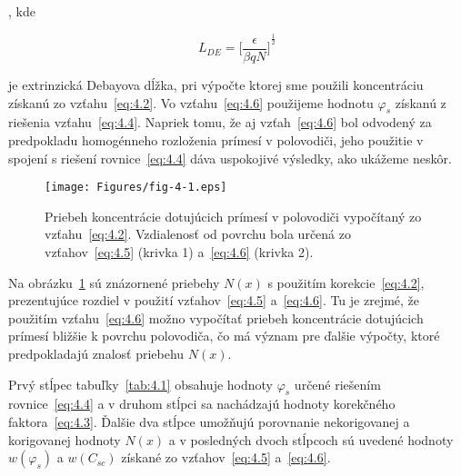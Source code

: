 , kde 

\begin{equation}\label{eq:4.7}
  L_{DE} = {\Big[\frac{\epsilon}{\beta qN}\Big]}^{\frac{1}{2}}
\end{equation}

je extrinzická Debayova dĺžka, pri výpočte ktorej sme použili
koncentráciu získanú zo vzťahu~\ref{eq:4.2}.  Vo vzťahu~\ref{eq:4.6}
použijeme hodnotu $\varphi_{s}$ získanú z riešenia
vzťahu~\ref{eq:4.4}.  Napriek tomu, že aj vzťah~\ref{eq:4.6} bol
odvodený za predpokladu homogénneho rozloženia prímesí v polovodiči,
jeho použitie v spojení s riešení rovnice~\ref{eq:4.4} dáva uspokojivé
výsledky, ako ukážeme neskôr.

\begin{figure}[h!]\centering
  \begin{minipage}[c]{\myfiguresize}
    \begin{center}
      \texttt{[image: Figures/fig-4-1.eps]}%
      \caption[Priebeh koncentrácie dotujúcich prímesí v polovodiči
        vypočítaný zo vzťahu~\ref{eq:4.2}]{Priebeh koncentrácie
        dotujúcich prímesí v polovodiči vypočítaný zo
        vzťahu~\ref{eq:4.2}. Vzdialenosť od povrchu bola určená zo
        vzťahov~\ref{eq:4.5} (krivka 1) a~\ref{eq:4.6} (krivka
        2).}\label{fig:4.1}
    \end{center}
  \end{minipage}
\end{figure}

Na obrázku~\ref{fig:4.1} sú znázornené priebehy $N(x)$ s použitím
korekcie~\ref{eq:4.2}, prezentujúce rozdiel v použití
vzťahov~\ref{eq:4.5} a~\ref{eq:4.6}. Tu je zrejmé, že použitím
vzťahu~\ref{eq:4.6} možno vypočítať priebeh koncentrácie dotujúcich
prímesí bližšie k povrchu polovodiča, čo má význam pre ďalšie výpočty,
ktoré predpokladajú znalosť priebehu $N(x)$.

Prvý stĺpec tabuľky~\ref{tab:4.1} obsahuje hodnoty $\varphi_{s}$
určené riešením rovnice~\ref{eq:4.4} a v druhom stĺpci sa nachádzajú
hodnoty korekčného faktora~\ref{eq:4.3}. Ďalšie dva stĺpce umožňujú
porovnanie nekorigovanej a korigovanej hodnoty $N(x)$ a v posledných
dvoch stĺpcoch sú uvedené hodnoty $w(\varphi_{s})$ a $w(C_{sc})$
získané zo vzťahov~\ref{eq:4.5} a~\ref{eq:4.6}.

